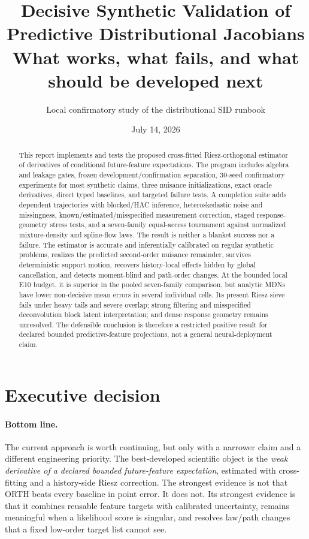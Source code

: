 \documentclass[11pt]{article}
\title{\textbf{Decisive Synthetic Validation of Predictive Distributional Jacobians}\\
\large What works, what fails, and what should be developed next}
\author{Local confirmatory study of the distributional SID runbook}
\date{July 14, 2026}
\begin{document}
\maketitle

\begin{abstract}
This report implements and tests the proposed cross-fitted Riesz-orthogonal estimator of derivatives of conditional future-feature expectations.  The program includes algebra and leakage gates, frozen development/confirmation separation, 30-seed confirmatory experiments for most synthetic claims, three nuisance initializations, exact oracle derivatives, direct typed baselines, and targeted failure tests.  A completion suite adds dependent trajectories with blocked/HAC inference, heteroskedastic noise and missingness, known/estimated/misspecified measurement correction, staged response-geometry stress tests, and a seven-family equal-access tournament against normalized mixture-density and spline-flow laws.  The result is neither a blanket success nor a failure.  The estimator is accurate and inferentially calibrated on regular synthetic problems, realizes the predicted second-order nuisance remainder, survives deterministic support motion, recovers history-local effects hidden by global cancellation, and detects moment-blind and path-order changes.  At the bounded local E10 budget, it is superior in the pooled seven-family comparison, but analytic MDNs have lower non-decisive mean errors in several individual cells.  Its present Riesz sieve fails under heavy tails and severe overlap; strong filtering and misspecified deconvolution block latent interpretation; and dense response geometry remains unresolved.  The defensible conclusion is therefore a restricted positive result for declared bounded predictive-feature projections, not a general neural-deployment claim.
\end{abstract}

\section{Executive decision}

\paragraph{Bottom line.}
The current approach is worth continuing, but only with a narrower claim and a different engineering priority.  The best-developed scientific object is the \emph{weak derivative of a declared bounded future-feature expectation}, estimated with cross-fitting and a history-side Riesz correction.  The strongest evidence is not that ORTH beats every baseline in point error.  It does not.  Its strongest evidence is that it combines reusable feature targets with calibrated uncertainty, remains meaningful when a likelihood score is singular, and resolves law/path changes that a fixed low-order target list cannot see.
\end{document}
